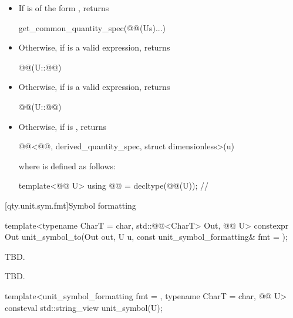 \begin{itemdescr}
\pnum
\returns
\begin{itemize}
\item
If  is of the form ,
returns
\begin{codeblock}
get_common_quantity_spec(@@(Us{})...)
\end{codeblock}
\item
Otherwise, if  is a valid expression,
returns
\begin{codeblock}
@@(U::@@)
\end{codeblock}
\item
Otherwise, if  is a valid expression,
returns
\begin{codeblock}
@@(U::@@)
\end{codeblock}
\item
Otherwise, if
is ,
returns
\begin{codeblock}
@@<@@, derived_quantity_spec, struct dimensionless>(u)
\end{codeblock}
where  is defined as follows:
\begin{codeblock}
template<@@ U>
using @@ = decltype(@@(U{}));  // \expos
\end{codeblock}
\end{itemize}
\end{itemdescr}

[qty.unit.sym.fmt]{Symbol formatting}

\begin{itemdecl}
template<typename CharT = char, std::@@<CharT> Out, @@ U>
constexpr Out unit_symbol_to(Out out, U u, const unit_symbol_formatting& fmt = {});
\end{itemdecl}

\begin{itemdescr}
\pnum
\effects
TBD.

\pnum
\returns
TBD.
\end{itemdescr}

\begin{itemdecl}
template<unit_symbol_formatting fmt = {}, typename CharT = char, @@ U>
consteval std::string_view unit_symbol(U);
\end{itemdecl}

